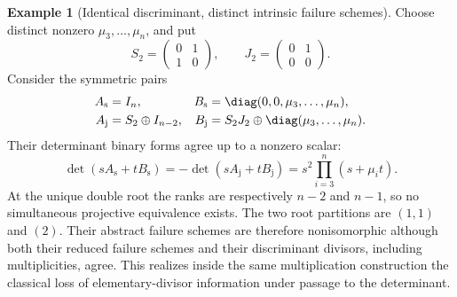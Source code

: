 \documentclass[11pt,reqno]{amsart}
\numberwithin{equation}{section}
\theoremstyle{definition}\newtheorem{definition}[theorem]{Definition}
\newtheorem{example}[theorem]{Example}
\theoremstyle{remark}\newtheorem{remark}[theorem]{Remark}
\begin{document}
\begin{example}[Identical discriminant, distinct intrinsic failure schemes]
\label{ex:same-discriminant-distinct-failure}
Choose distinct nonzero \(\mu_3,\ldots,\mu_n\), and put
\[
 S_2=\begin{pmatrix}0&1\\1&0\end{pmatrix},\qquad
 J_2=\begin{pmatrix}0&1\\0&0\end{pmatrix}.
\]
Consider the symmetric pairs
\begin{align*}
 A_{\mathrm{s}}&=I_n,&
 B_{\mathrm{s}}&=\diag(0,0,\mu_3,\ldots,\mu_n),\\
 A_{\mathrm{j}}&=S_2\oplus I_{n-2},&
 B_{\mathrm{j}}&=S_2J_2\oplus\diag(\mu_3,\ldots,\mu_n).
\end{align*}
Their determinant binary forms agree up to a nonzero scalar:
\begin{equation}\label{eq:same-discriminant-pencils}
 \det(sA_{\mathrm{s}}+tB_{\mathrm{s}})
 =-\det(sA_{\mathrm{j}}+tB_{\mathrm{j}})
 =s^2\prod_{i=3}^n(s+\mu_i t).
\end{equation}
At the unique double root the ranks are respectively \(n-2\)
and \(n-1\), so no simultaneous projective equivalence exists.
The two root partitions are \((1,1)\) and \((2)\).
Their abstract failure schemes are therefore nonisomorphic although
both their reduced failure schemes and their discriminant divisors,
including multiplicities, agree.  This realizes inside the same
multiplication construction the classical loss of elementary-divisor
information under passage to the determinant.
\end{example}
\end{document}
